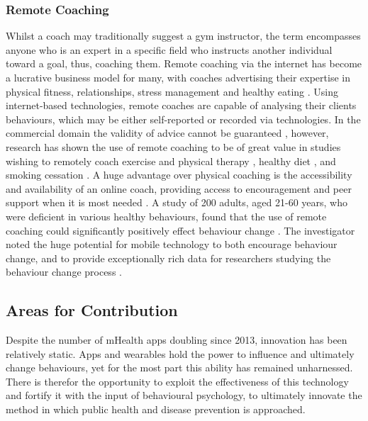 \subsubsection{Remote Coaching}
Whilst a coach may traditionally suggest a gym instructor, the term encompasses anyone who is an expert in a specific field who instructs another individual toward a goal, thus, coaching them. Remote coaching via the internet has become a lucrative business model for many, with coaches advertising their expertise in physical fitness, relationships, stress management and healthy eating \cite{Smith2014a, rossett2005if}. Using internet-based technologies, remote coaches are capable of analysing their clients behaviours, which may be either self-reported or recorded via technologies\cite{Jimison2015,eemcs22577,kyfonidis2015future}.
In the commercial domain the validity of advice cannot be guaranteed \cite{Smith2014a}, however, research has shown the use of remote coaching to be of great value in studies wishing to remotely coach exercise and physical therapy \cite{Jimison2015,Geraedts2013,Spring2012}, healthy diet \cite{Spring2012}, and smoking cessation \cite{Sforzo2014}.
A huge advantage over physical coaching is the accessibility and availability of an online coach, providing access to encouragement and peer support when it is most needed \cite{kyfonidis2015future}. A study of 200 adults, aged 21-60 years, who were deficient in various healthy behaviours, found that the use of remote coaching could significantly positively effect behaviour change \cite{Nothwehr2013}. The investigator \citeauthor{Nothwehr2013} noted the huge potential for mobile technology to both encourage behaviour change, and to provide exceptionally rich data for researchers studying the behaviour change process \cite{Nothwehr2013}.

\subsection{Areas for Contribution}
Despite the number of mHealth apps doubling since 2013, innovation has been relatively static. Apps and wearables hold the power to influence and ultimately change behaviours, yet for the most part this ability has remained unharnessed.
There is therefor the opportunity to exploit the effectiveness of this technology and fortify it with the input of behavioural psychology, to ultimately innovate the method in which public health and disease prevention is approached.

